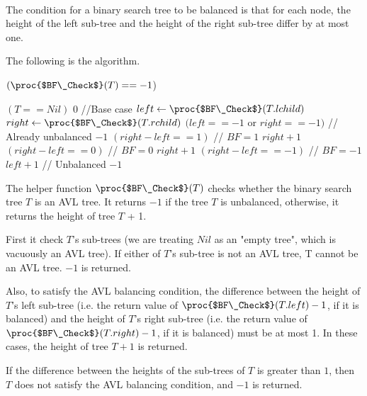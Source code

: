 \documentclass[11pt, answers]{exam}
\theoremstyle{plain}
\theoremstyle{definition}
\begin{document}
\begin{questions}
\begin{solution}
\begin{parts}
\end{parts}
\end{solution}


\question
\begin{solution}\\
The condition for a binary search tree to be balanced is that for each node, the height of the left sub-tree and the height of the right sub-tree differ by at most one.

The following is the algorithm.

\begin{codebox}
\li \If $(\proc{$BF\_Check$}(T) == -1$)
\li     \Then \Return {}
\li \Else
\li     \Return {}
\end{codebox}

\begin{codebox}
\li \If $(T == Nil)$ 
\li     \Then \Return $0$ //Base case
\li \Else
\li     $left \gets \proc{$BF\_Check$}(T.lchild)$
\li     $right \gets \proc{$BF\_Check$}(T.rchild)$
\li     \If $(left == -1 $ or $ right == -1)$ // Already unbalanced
\li         \Then \Return $-1$ 
\li     \ElseIf $(right - left == 1)$       // $BF=1$
\li         \Then \Return $right+1$ 
\li     \ElseIf $(right - left == 0)$       // $BF=0$
\li         \Then \Return $right+1$ 
\li     \ElseIf $(right - left == -1)$      // $BF=-1$
\li         \Then \Return $left+1$ 
\li     \Else // Unbalanced
\li         \Return $-1$ \End \End
\end{codebox}

The helper function $\proc{$BF\_Check$}(T)$ checks whether the binary search tree $T$ is an AVL tree. It returns $-1$ if the tree $T$ is unbalanced, otherwise, it returns the height of tree $T$ + 1.

First it check $T$'s sub-trees (we are treating $Nil$ as an "empty tree", which is vacuously an AVL tree). If either of $T$'s sub-tree is not an AVL tree, T cannot be an AVL tree. $-1$ is returned.

Also, to satisfy the AVL balancing condition, the difference between the height of $T$'s left sub-tree (i.e. the return value of $\proc{$BF\_Check$}(T.left)-1$, if it is balanced) and the height of $T$'s right sub-tree (i.e. the return value of $\proc{$BF\_Check$}(T.right)-1$, if it is balanced) must be at most 1. In these cases, the height of tree $T + 1$ is returned. 

If the difference between the heights of the sub-trees of $T$ is greater than $1$, then $T$ does not satisfy the AVL balancing condition, and $-1$ is returned.


\end{solution}
\end{questions}
\end{document}
